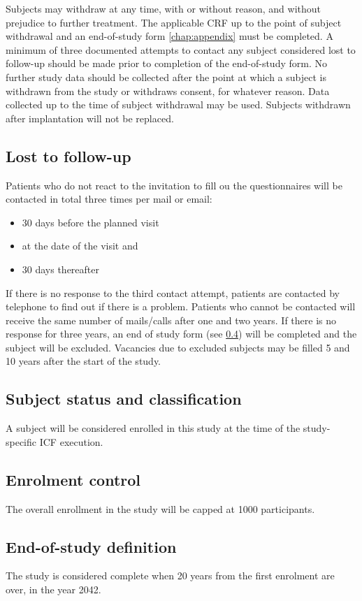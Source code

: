 Subjects may withdraw at any time, with or without reason, and without prejudice to further treatment. The applicable \ac{CRF} up to the point of subject withdrawal and an end-of-study form \ref{chap:appendix} must be completed. A minimum of three documented attempts to contact any subject considered lost to follow-up should be made prior to completion of the end-of-study form. No further study data should be collected after the point at which a subject is withdrawn from the study or withdraws consent, for whatever reason. Data collected up to the time of subject withdrawal may be used. Subjects withdrawn after implantation will not be replaced.

\subsection{Lost to follow-up}
Patients who do not react to the invitation to fill ou the questionnaires will be contacted in total three times per mail or email:
\begin{itemize}
\item 30 days before the planned visit
\item at the date of the visit and
\item 30 days thereafter
\end{itemize}
If there is no response to the third contact attempt, patients are contacted by telephone to find out if there is a problem. Patients who cannot be contacted will receive the same number of mails/calls after one and two years. If there is no response for three years, an end of study form (see \ref{}) will be completed and the subject will be excluded. Vacancies due to excluded subjects may be filled 5 and 10 years after the start of the study.

\subsection{Subject status and classification}
A subject will be considered enrolled in this study at the time of the study-specific \ac{ICF} execution.

\subsection{Enrolment control}
The overall enrollment in the study will be capped at \num[round-precision = 0, round-mode = places]{1000} participants.

\subsection{End-of-study definition}
The study is considered complete when 20 years from the first enrolment are over, in the year 2042.

